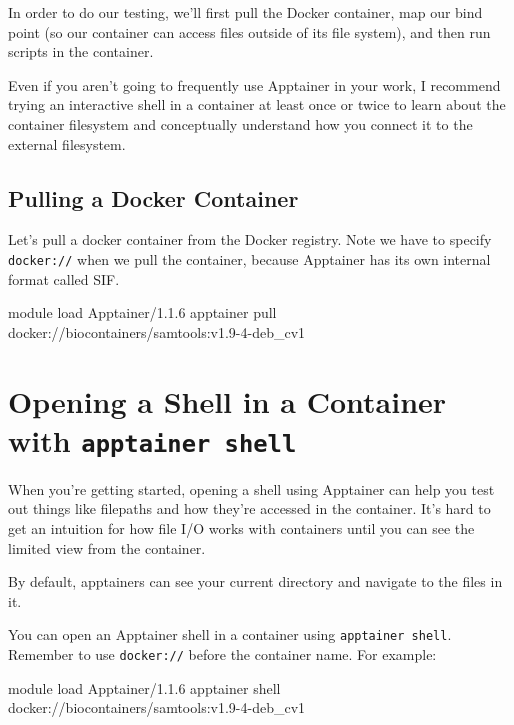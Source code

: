 \documentclass[
  letterpaper,
  DIV=11,
  numbers=noendperiod]{scrreprt}
\newenvironment{Shaded}{\begin{snugshade}}{\end{snugshade}}
\newcommand{\ExtensionTok}[1]{\textcolor[rgb]{0.00,0.23,0.31}{#1}}
\newcommand{\NormalTok}[1]{\textcolor[rgb]{0.00,0.23,0.31}{#1}}
\begin{document}
In order to do our testing, we'll first pull the Docker container, map
our bind point (so our container can access files outside of its file
system), and then run scripts in the container.

Even if you aren't going to frequently use Apptainer in your work, I
recommend trying an interactive shell in a container at least once or
twice to learn about the container filesystem and conceptually
understand how you connect it to the external filesystem.

\subsection{Pulling a Docker
Container}\label{pulling-a-docker-container}

Let's pull a docker container from the Docker registry. Note we have to
specify \texttt{docker://} when we pull the container, because Apptainer
has its own internal format called SIF.

\begin{Shaded}
\begin{Highlighting}[]
\ExtensionTok{module}\NormalTok{ load Apptainer/1.1.6}
\ExtensionTok{apptainer}\NormalTok{ pull docker://biocontainers/samtools:v1.9{-}4{-}deb\_cv1}
\end{Highlighting}
\end{Shaded}

\section{\texorpdfstring{Opening a Shell in a Container with
\texttt{apptainer\ shell}}{Opening a Shell in a Container with apptainer shell}}\label{opening-a-shell-in-a-container-with-apptainer-shell}

When you're getting started, opening a shell using Apptainer can help
you test out things like filepaths and how they're accessed in the
container. It's hard to get an intuition for how file I/O works with
containers until you can see the limited view from the container.

By default, apptainers can see your current directory and navigate to
the files in it.

You can open an Apptainer shell in a container using
\texttt{apptainer\ shell}. Remember to use \texttt{docker://} before the
container name. For example:

\begin{Shaded}
\begin{Highlighting}[]
\ExtensionTok{module}\NormalTok{ load Apptainer/1.1.6}
\ExtensionTok{apptainer}\NormalTok{ shell docker://biocontainers/samtools:v1.9{-}4{-}deb\_cv1}
\end{Highlighting}
\end{Shaded}
\end{document}
